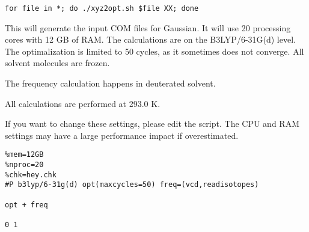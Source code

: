 \begin{lstlisting}[caption=XYZ to COM]
for file in *; do ./xyz2opt.sh $file XX; done
\end{lstlisting}

This will generate the input COM files for Gaussian. It will use 20 processing 
cores with 12 GB of RAM. The calculations are on the B3LYP/6-31G(d) level. 
The optimalization is limited to 50 cycles, as it sometimes does not converge.
All solvent molecules are frozen.

The frequency calculation happens in deuterated solvent.

All calculations are performed at 293.0 K.

\null

If you want to change these settings, please edit the script. The CPU and RAM 
settings may have a large performance impact if overestimated.

\begin{verbatim}
%mem=12GB
%nproc=20
%chk=hey.chk
#P b3lyp/6-31g(d) opt(maxcycles=50) freq=(vcd,readisotopes)

opt + freq

0 1
\end{verbatim}